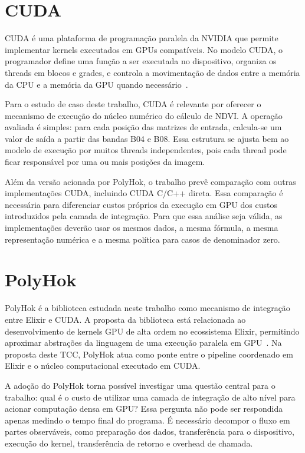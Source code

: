 \documentclass[tcc,capa]{texufpel}
\begin{document}
\section{CUDA}

CUDA é uma plataforma de programação paralela da NVIDIA que permite implementar
kernels executados em GPUs compatíveis. No modelo CUDA, o programador define uma
função a ser executada no dispositivo, organiza os threads em blocos e grades, e
controla a movimentação de dados entre a memória da CPU e a memória da GPU
quando necessário~\cite{nvidiaCudaGuide2026}.

Para o estudo de caso deste trabalho, CUDA é relevante por oferecer o mecanismo de
execução do núcleo numérico do cálculo de NDVI. A operação avaliada é simples:
para cada posição das matrizes de entrada, calcula-se um valor de saída a partir das
bandas B04 e B08. Essa estrutura se ajusta bem ao modelo de execução por muitos
threads independentes, pois cada thread pode ficar responsável por uma ou mais
posições da imagem.

Além da versão acionada por PolyHok, o trabalho prevê comparação com outras
implementações CUDA, incluindo CUDA C/C++ direta. Essa comparação é necessária
para diferenciar custos próprios da execução em GPU dos custos introduzidos pela
camada de integração. Para que essa análise seja válida, as implementações deverão
usar os mesmos dados, a mesma fórmula, a mesma representação numérica e a mesma
política para casos de denominador zero.

\section{PolyHok}

PolyHok é a biblioteca estudada neste trabalho como mecanismo de integração entre
Elixir e CUDA. A proposta da biblioteca está relacionada ao desenvolvimento de
kernels GPU de alta ordem no ecossistema Elixir, permitindo aproximar abstrações da
linguagem de uma execução paralela em GPU~\cite{duBoisCavalheiro2025}. Na
proposta deste TCC, PolyHok atua como ponte entre o pipeline coordenado em Elixir e
o núcleo computacional executado em CUDA.

A adoção do PolyHok torna possível investigar uma questão central para o trabalho:
qual é o custo de utilizar uma camada de integração de alto nível para acionar
computação densa em GPU? Essa pergunta não pode ser respondida apenas medindo o
tempo final do programa. É necessário decompor o fluxo em partes observáveis, como
preparação dos dados, transferência para o dispositivo, execução do kernel,
transferência de retorno e overhead de chamada.
\end{document}
